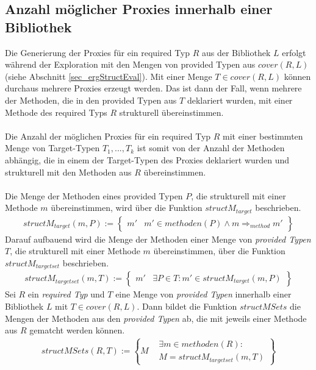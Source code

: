 \subsection{Anzahl möglicher Proxies innerhalb einer Bibliothek}\label{sec_anzahlProxies}
Die Generierung der Proxies für ein required Typ $R$ aus der Bibliothek $L$ erfolgt während der Exploration mit den Mengen von provided Typen aus $\mathit{cover(R,L)}$ (siehe Abschnitt \ref{sec_ergStructEval}). Mit einer Menge $T \in \mathit{cover(R,L)}$ können durchaus mehrere Proxies erzeugt werden. Das ist dann der Fall, wenn mehrere der Methoden, die in den provided Typen aus $T$ deklariert wurden, mit einer Methode des required Typs $R$ strukturell übereinstimmen.
\\\\
Die Anzahl der möglichen Proxies für ein required Typ $R$ mit einer bestimmten Menge von Target-Typen $T_1,...,T_k$ ist somit von der Anzahl der Methoden abhängig, die in einem der Target-Typen des Proxies deklariert wurden und strukturell mit den Methoden aus $R$ übereinstimmen. 
\\\\
Die Menge der Methoden eines provided Typen $P$, die strukturell mit einer Methode $m$ übereinstimmen, wird über die Funktion $\mathit{structM_{target}}$ beschrieben.
\begin{gather*}
\mathit{structM_{target}(m, P)} := 
\left\{\begin{array}{l|l}
m'	& m' \in \mathit{methoden(P)} \wedge  m \Rightarrow_{method} m'
\end{array}
\right\}
\end{gather*}
\noindent
Darauf aufbauend wird die Menge der Methoden einer Menge von \emph{provided Typen} $T$, die strukturell mit einer Methode $m$ übereinstimmen, über die Funktion $\mathit{structM_{targetset}}$ beschrieben.
\begin{gather*}
\mathit{structM_{targetset}(m, T)} := 
\left\{\begin{array}{l|l}
m'	& \exists P \in T: m' \in \mathit{structM_{target}(m,P)}
\end{array}
\right\}
\end{gather*}
\noindent
Sei $R$ ein \emph{required Typ} und $T$ eine Menge von \emph{provided Typen} innerhalb einer Bibliothek $L$ mit $T \in \mathit{cover(R,L)}$. Dann bildet die Funktion $\mathit{structMSets}$ die Mengen der Methoden aus den \emph{provided Typen} ab, die mit jeweils einer Methode aus $R$ gematcht werden können.
\begin{gather*}
\mathit{structMSets(R,T)} := 
\left\{M
\begin{array}{l|l}
&\exists \mathit{m} \in \mathit{methoden(R)} : 
\\
&M = \mathit{structM_{targetset}(m,T)}
\end{array}
\right\}
\end{gather*}
